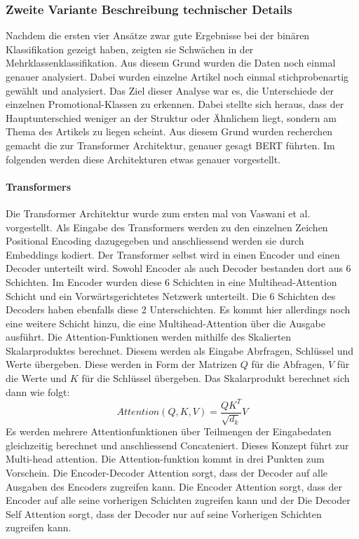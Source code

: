 \subsubsection{Zweite Variante Beschreibung technischer Details}
Nachdem die ersten vier Ansätze zwar gute Ergebnisse bei der binären Klassifikation gezeigt haben, zeigten sie Schwächen in der Mehrklassenklassifikation. Aus diesem Grund wurden die Daten noch einmal genauer analysiert. Dabei wurden einzelne Artikel noch einmal stichprobenartig gewählt und analysiert. Das Ziel dieser Analyse war es, die Unterschiede der einzelnen Promotional-Klassen zu erkennen. Dabei stellte sich heraus, dass der Hauptunterschied weniger an der Struktur oder Ähnlichem liegt, sondern am Thema des Artikels zu liegen scheint. Aus diesem Grund wurden recherchen gemacht die zur Transformer Architektur, genauer gesagt BERT führten. Im folgenden werden diese Architekturen etwas genauer vorgestellt.
\paragraph{Transformers}
Die Transformer Architektur wurde zum ersten mal von Vaswani et al. \cite{Attention} vorgestellt. Als Eingabe des Transformers werden zu den einzelnen Zeichen Positional Encoding dazugegeben und anschliessend werden sie durch Embeddings kodiert. Der Transformer selbst wird in einen Encoder und einen Decoder unterteilt wird. Sowohl Encoder als auch Decoder bestanden dort aus 6 Schichten. Im Encoder wurden diese 6 Schichten in eine Multihead-Attention Schicht und ein Vorwärtsgerichtetes Netzwerk unterteilt. Die 6 Schichten des Decoders haben ebenfalls diese 2 Unterschichten. Es kommt hier allerdings noch eine weitere Schicht hinzu, die eine Multihead-Attention über die Ausgabe ausführt. Die Attention-Funktionen werden mithilfe des Skalierten Skalarproduktes berechnet. Diesem werden als Eingabe Abrfragen, Schlüssel und Werte übergeben. Diese werden in Form der Matrizen $Q$ für die Abfragen, $V$ für die Werte und $K$ für die Schlüssel übergeben. Das Skalarprodukt berechnet sich dann wie folgt:
$${Attention(Q,K,V)} = {\frac{QK^T}{\sqrt{d_k}} V}$$
Es werden mehrere Attentionfunktionen über Teilmengen der Eingabedaten gleichzeitig berechnet und anschliessend Concateniert. Dieses Konzept führt zur Multi-head attention. Die Attention-funktion kommt in drei Punkten zum Vorschein. Die Encoder-Decoder Attention sorgt, dass der Decoder auf alle Ausgaben des Encoders zugreifen kann. Die Encoder Attention sorgt, dass der Encoder auf alle seine vorherigen Schichten zugreifen kann und der Die Decoder Self Attention sorgt, dass der Decoder nur auf seine Vorherigen Schichten zugreifen kann.
